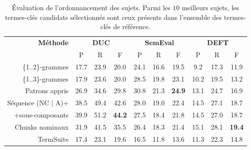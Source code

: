     \begin{table*}
      \centering
      \begin{tabular}{@{~~}rc@{~~~}c@{~~~}cc@{~~~}c@{~~~}cc@{~~~}c@{~~~}c@{~~}}
        \toprule
        \multirow{2}{*}[-2pt]{\textbf{Méthode}} & \multicolumn{3}{c}{\textbf{DUC}} & \multicolumn{3}{c}{\textbf{SemEval}} & \multicolumn{3}{c}{\textbf{DEFT}}\\
        \cmidrule(lr){2-4}\cmidrule(lr){5-7}\cmidrule(lr){8-10}
        & P & R & F & P & R & F & P & R & F\\
        \midrule
        \{1..2\}-grammes & 17.7 & 23.9 & 20.0 & 24.1 & 16.6 & 19.5 & 9.2 & 17.3 & 11.9\\
        \{1..3\}-grammes & 17.9 & 23.6 & 20.0 & 28.5 & 19.8 & 23.1 & 10.2 & 19.5 & 13.2\\
        Patrons appris & 26.9 & 34.6 & 29.8 & 30.8 & 21.3 & \textbf{24.9} & 13.1 & 24.7 & 16.9\\
        Séquence (NC | A)+ & 38.5 & 49.4 & 42.6 & 28.0 & 19.0 & 22.4 & 14.5 & 27.1 & 18.7\\
        +sous-composants & 39.9 & 51.2 & \textbf{44.2} & 27.5 & 18.4 & 21.8 & 14.5 & 27.0 & 18.7\\
        Chunks nominaux & 31.9 & 41.5 & 35.5 & 26.4 & 18.3 & 21.4 & 15.1 & 28.1 & \textbf{19.4}\\
        TermSuite & 17.4 & 23.1 & 19.6 & 16.5 & 11.8 & 13.6 & 11.3 & 22.3 & 14.8\\
        \bottomrule
      \end{tabular}
      \caption{Évaluation de l'ordonnancement des sujets. Parmi les $10$
               meilleurs sujets, les termes-clés candidats sélectionnés sont
               ceux présents dans l'ensemble des termes-clés de référence.
               \label{tab:evaluation_de_l_ordonnancement_des_clusters}}
    \end{table*}

